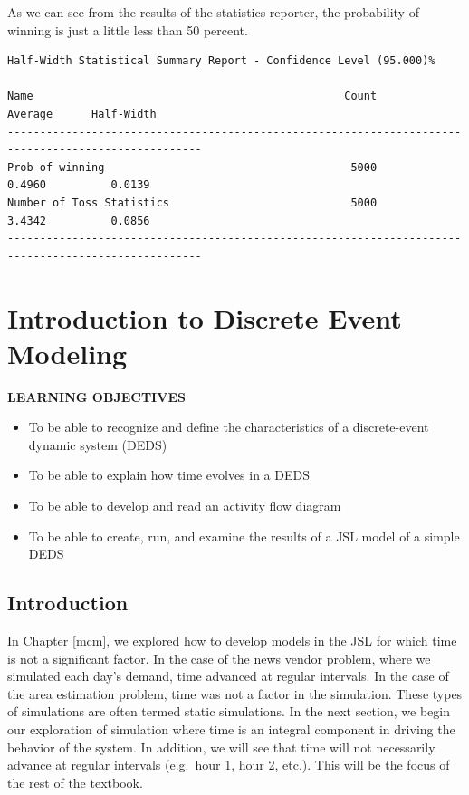 \documentclass[
]{book}
\theoremstyle{definition}
\theoremstyle{definition}
\theoremstyle{definition}
\theoremstyle{definition}
\theoremstyle{remark}
\begin{document}
As we can see from the results of the statistics reporter, the probability of winning is just a little less than 50 percent.

\begin{verbatim}
Half-Width Statistical Summary Report - Confidence Level (95.000)% 

Name                                                Count         Average      Half-Width 
---------------------------------------------------------------------------------------------------- 
Prob of winning                                      5000          0.4960          0.0139 
Number of Toss Statistics                            5000          3.4342          0.0856 
---------------------------------------------------------------------------------------------------- 
\end{verbatim}

\hypertarget{introDEDS}{%
\chapter{Introduction to Discrete Event Modeling}\label{introDEDS}}

\textbf{\textsc{LEARNING OBJECTIVES}}

\begin{itemize}
\item
  To be able to recognize and define the characteristics of a
  discrete-event dynamic system (DEDS)
\item
  To be able to explain how time evolves in a DEDS
\item
  To be able to develop and read an activity flow diagram
\item
  To be able to create, run, and examine the results of a JSL model of
  a simple DEDS
\end{itemize}

\hypertarget{introDEDS:Intro}{%
\section{Introduction}\label{introDEDS:Intro}}

In Chapter \ref{mcm}, we
explored how to develop models in the JSL for which time is not a
significant factor. In the case of the news vendor problem, where we
simulated each day's demand, time advanced at regular intervals. In the
case of the area estimation problem, time was not a factor in the
simulation. These types of simulations are often termed static
simulations. In the next section, we begin our exploration of simulation
where time is an integral component in driving the behavior of the
system. In addition, we will see that time will not necessarily advance
at regular intervals (e.g.~hour 1, hour 2, etc.). This will be the focus
of the rest of the textbook.
\end{document}
